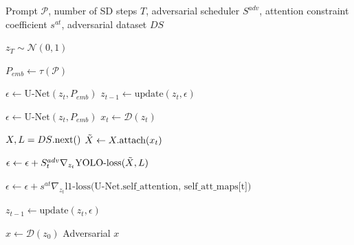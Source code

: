 \renewcommand{\algorithmicrequire}{\textbf{Inputs：}\unskip}
\renewcommand{\algorithmicensure}{\textbf{Output：}\unskip}
\renewcommand{\algorithmiccomment}[1]{\textcolor{gray}{{\scriptsize$\triangleright$}\,#1}}


\begin{algorithm}
  \caption{Sample adversarial $x$ based on non-adversarial $\hat{x}$}
  \label{alg1}
  \small
  \begin{algorithmic}
    \REQUIRE Prompt $\mathcal{P}$, number of SD steps $T$, adversarial scheduler $S^{adv}$, attention constraint coefficient $s^{at}$, adversarial dataset $DS$

    \STATE $z_T \sim \mathcal{N}(0, 1)$\hspace{2.38cm}
    
    \STATE $P_{emb} \gets \tau(\mathcal{P})$\hspace{2.5cm}

        \quad
        \STATE $\epsilon \gets \text{U-Net}(z_t, P_{emb})$
        \STATE $z_{t - 1} \gets \text{update}(z_t, \epsilon)$
    \ENDFOR

        \STATE $\epsilon \gets \text{U-Net}(z_t, P_{emb})$
        \STATE $x_t \gets \mathcal{D}(z_t)$\hspace{2.32cm}

	\STATE $X, L = DS\text{.next\hspace{0.05cm}}()$
        \STATE $\Tilde{X} \gets X.\text{attach}(x_t)$\hspace{1.3cm}

        \STATE $\epsilon \gets \epsilon + S^{adv}_t\nabla_{z_t}\text{YOLO-loss}(\Tilde{X}, L)$\hspace{4.127cm}

        \STATE $\epsilon \gets \epsilon + s^{at}\nabla_{z_t}\text{l1-loss(U-Net.self\_attention, self\_att\_maps[t])}$\quad

        \STATE $z_{t - 1} \gets \text{update}(z_t, \epsilon)$
    \ENDFOR

    \STATE $x \gets \mathcal{D}(z_0)$
    \ENSURE Adversarial $x$
  \end{algorithmic}
\end{algorithm}

